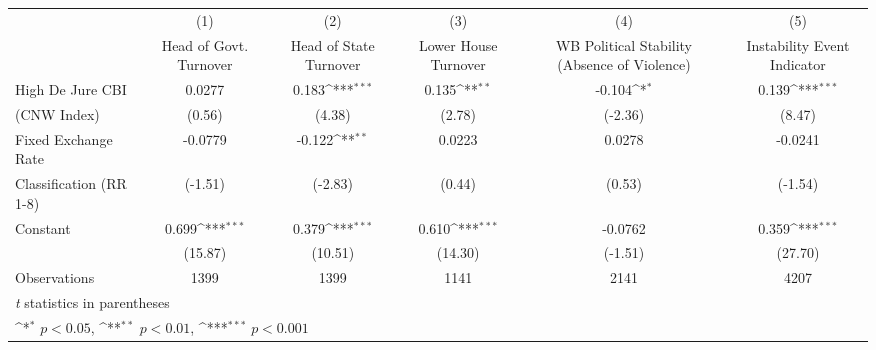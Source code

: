 {
\def\sym#1{\ifmmode^{#1}\else\(^{#1}\)\fi}
\begin{tabular}{l*{5}{c}}
\hline\hline
                    &\multicolumn{1}{c}{(1)}&\multicolumn{1}{c}{(2)}&\multicolumn{1}{c}{(3)}&\multicolumn{1}{c}{(4)}&\multicolumn{1}{c}{(5)}\\
                    &\multicolumn{1}{c}{Head of Govt. Turnover}&\multicolumn{1}{c}{Head of State Turnover}&\multicolumn{1}{c}{Lower House Turnover}&\multicolumn{1}{c}{WB Political Stability (Absence of Violence)}&\multicolumn{1}{c}{Instability Event Indicator}\\
\hline
High De Jure CBI    &      0.0277         &       0.183\sym{***}&       0.135\sym{**} &      -0.104\sym{*}  &       0.139\sym{***}\\
(CNW Index)         &      (0.56)         &      (4.38)         &      (2.78)         &     (-2.36)         &      (8.47)         \\
[1em]
Fixed Exchange Rate &     -0.0779         &      -0.122\sym{**} &      0.0223         &      0.0278         &     -0.0241         \\
Classification (RR 1-8)&     (-1.51)         &     (-2.83)         &      (0.44)         &      (0.53)         &     (-1.54)         \\
[1em]
Constant            &       0.699\sym{***}&       0.379\sym{***}&       0.610\sym{***}&     -0.0762         &       0.359\sym{***}\\
                    &     (15.87)         &     (10.51)         &     (14.30)         &     (-1.51)         &     (27.70)         \\
\hline
Observations        &        1399         &        1399         &        1141         &        2141         &        4207         \\
\hline\hline
\multicolumn{6}{l}{\footnotesize \textit{t} statistics in parentheses}\\
\multicolumn{6}{l}{\footnotesize \sym{*} \(p<0.05\), \sym{**} \(p<0.01\), \sym{***} \(p<0.001\)}\\
\end{tabular}
}
